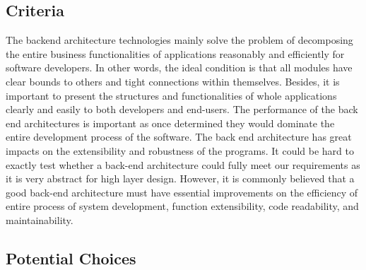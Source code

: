 \documentclass[letterpaper,10pt]{article}
\begin{document}
	\subsection{Criteria}
  The backend architecture technologies mainly solve the problem of decomposing the entire business functionalities of applications reasonably and efficiently for software developers. In other words, the ideal condition is that all modules have clear bounds to others and tight connections within themselves. Besides, it is important to present the structures and functionalities of whole applications clearly and easily to both developers and end-users.
  The performance of the back end architectures is important as once determined they would dominate the entire development process of the software. The back end architecture has great impacts on the extensibility and robustness of the programs. It could be hard to exactly test whether a back-end architecture could fully meet our requirements as it is very abstract for high layer design. However, it is commonly believed that a good back-end architecture must have essential improvements on the efficiency of entire process of system development, function extensibility, code readability, and maintainability.

	\subsection{Potential Choices}
\end{document}
